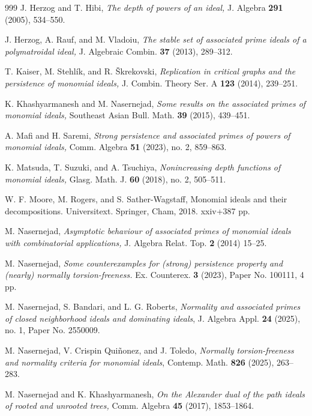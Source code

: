 \documentclass[11pt]{amsart}
\begin{document}
\begin{thebibliography}{999}
   J. Herzog and  T. Hibi,  {\it The depth of powers of  an ideal,} J. Algebra {\bf 291} (2005),  534--550.


  J. Herzog, A. Rauf, and M. Vladoiu, {\it The stable set of associated prime ideals of a polymatroidal ideal,}  J. Algebraic Combin. {\bf 37} (2013),  289--312.


 T. Kaiser, M. Stehl{\'i}k, and R. {\v S}krekovski, \textit{Replication in critical graphs and the persistence of monomial ideals,}
J. Combin. Theory Ser. A \textbf{123} (2014), 239--251.

 K. Khashyarmanesh and  M. Nasernejad,  {\it Some results on the  associated primes of monomial ideals,} Southeast Asian Bull. Math. {\bf 39} (2015), 439--451.

 A. Mafi and H. Saremi, \textit{Strong persistence and associated primes of powers of monomial ideals,} 
 Comm. Algebra \textbf{51} (2023), no. 2, 859--863. 

 K. Matsuda, T.  Suzuki, and A.  Tsuchiya, \textit{Nonincreasing depth functions of monomial ideals,}  Glasg. Math. J. \textbf{60}
 (2018), no. 2, 505--511. 


 W. F. Moore, M. Rogers, and S. Sather-Wagstaff,  Monomial ideals and their decompositions. Universitext. Springer, Cham, 2018. xxiv+387 pp. 

   M. Nasernejad, {\it Asymptotic behaviour of associated primes of monomial ideals with combinatorial applications,}  J. Algebra Relat. Top.
 {\bf 2} (2014) 15--25.

 M. Nasernejad, \textit{Some counterexamples for (strong) persistence property and (nearly) normally torsion-freeness.}
Ex. Counterex. \textbf{3} (2023), Paper No. 100111, 4 pp. 

 M. Nasernejad, S. Bandari,  and L. G. Roberts, \textit{Normality and associated primes of closed neighborhood  ideals and dominating ideals}, 
J. Algebra Appl. \textbf{24} (2025), no. 1, Paper No. 2550009.

 

  M. Nasernejad,  V. Crispin  Qui\~nonez,  and   J. Toledo, \textit{Normally torsion-freeness and normality  criteria for monomial ideals}, 
Contemp. Math. \textbf{826} (2025), 263--283. 


    M. Nasernejad   and K. Khashyarmanesh, {\it On the Alexander dual of the path ideals of rooted and unrooted trees,} Comm. Algebra  
  {\bf 45} (2017), 1853--1864.


\end{thebibliography}
\end{document}
